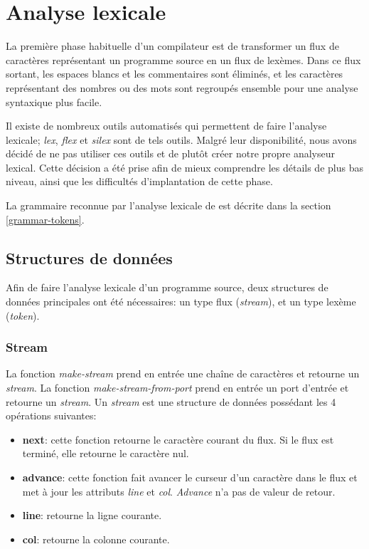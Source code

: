 \documentclass[11pt]{report}
\begin{document}
\chapter{Analyse lexicale}

La première phase habituelle d'un compilateur est de transformer un
flux de caractères représentant un programme source en un flux de
lexèmes.  Dans ce flux sortant, les espaces blancs et les commentaires
sont éliminés, et les caractères représentant des nombres ou des mots
sont regroupés ensemble pour une analyse syntaxique plus facile.

Il existe de nombreux outils automatisés qui permettent de faire
l'analyse lexicale; \emph{lex}, \emph{flex} et \emph{silex} sont de
tels outils.  Malgré leur disponibilité, nous avons décidé de ne pas
utiliser ces outils et de plutôt créer notre propre analyseur lexical.
Cette décision a été prise afin de mieux comprendre les détails de
plus bas niveau, ainsi que les difficultés d'implantation de cette
phase.

La grammaire reconnue par l'analyse lexicale de \sins{} est décrite
dans la section \ref{grammar-tokens}.

\section{Structures de données}

Afin de faire l'analyse lexicale d'un programme source, deux
structures de données principales ont été nécessaires: un type flux
(\emph{stream}), et un type lexème (\emph{token}).

\subsection{Stream}

La fonction \emph{make-stream} prend en entrée une chaîne de
caractères et retourne un \emph{stream}.  La fonction
\emph{make-stream-from-port} prend en entrée un port d'entrée et
retourne un \emph{stream}.  Un \emph{stream} est une structure de
données possédant les 4 opérations suivantes:

\begin{itemize}
\item {\bf next}: cette fonction retourne le caractère courant du
  flux.  Si le flux est terminé, elle retourne le caractère nul.
\item {\bf advance}: cette fonction fait avancer le curseur d'un
  caractère dans le flux et met à jour les attributs \emph{line} et
  \emph{col}.  \emph{Advance} n'a pas de valeur de retour.
\item {\bf line}: retourne la ligne courante.
\item {\bf col}: retourne la colonne courante.
\end{itemize}
\end{document}
